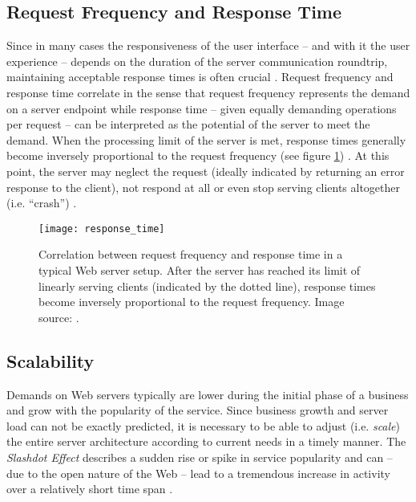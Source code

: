 \subsection{Request Frequency and Response Time}
\label{lab:frequency}
Since in many cases the responsiveness of the user interface -- and with it the user experience -- depends on the duration of the server communication roundtrip, maintaining acceptable response times is often crucial \cite[p. 1]{Nadimpalli2000}. Request frequency and response time correlate in the sense that request frequency represents the demand on a server endpoint while response time -- given equally demanding operations per request -- can be interpreted as the potential of the server to meet the demand. When the processing limit of the server is met, response times generally become inversely proportional to the request frequency (see figure \ref{fig:response_time}) \cite{response_time}. At this point, the server may neglect the request (ideally indicated by returning an error response to the client), not respond at all or even stop serving clients altogether (i.e. ``crash'') \cite{http}.

\begin{figure}
\centering\small
\setlength{\tabcolsep}{0mm}
  \texttt{[image: response\_time]}
\caption{
Correlation between request frequency and response time in a typical Web server setup. After the server has reached its limit of linearly serving clients (indicated by the dotted line), response times become inversely proportional to the request frequency. Image source: \cite{response_time}.
}
\label{fig:response_time}
\end{figure}

\subsection{Scalability}
\label{lab:scalabilty}
Demands on Web servers typically are lower during the initial phase of a business and grow with the popularity of the service. Since business growth and server load can not be exactly predicted, it is necessary to be able to adjust (i.e. \textit{scale}) the entire server architecture according to current needs in a timely manner. The \textit{Slashdot Effect} describes a sudden rise or spike in service popularity and can -- due to the open nature of the Web -- lead to a tremendous increase in activity over a relatively short time span \cite[p. 1]{Drolia2010}. 

